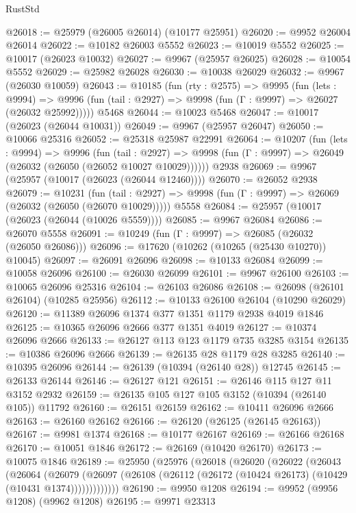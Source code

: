 \begin{lexlean}{RustStd}
\begin{coremodule}
@26018 := @25979 (@26005 @26014) (@10177 @25951)
@26020 := @9952 @26004 @26014
@26022 := @10182 @26003 @5552
@26023 := @10019 @5552
@26025 := @10017 (@26023 @10032)
@26027 := @9967 (@25957 @26025)
@26028 := @10054 @5552
@26029 := @25982 @26028
@26030 := @10038 @26029
@26032 := @9967 (@26030 @10059)
@26043 := @10185
    (fun (rty : @2575) =>
    @9995
      (fun (lets : @9994) =>
      @9996 (fun (tail : @2927) => @9998 (fun (Γ : @9997) => @26027 (@26032 @25992)))))
    @5468
@26044 := @10023 @5468
@26047 := @10017 (@26023 (@26044 @10031))
@26049 := @9967 (@25957 @26047)
@26050 := @10066 @25316
@26052 := @25318 @25987 @22991
@26064 := @10207
    (fun (lets : @9994) =>
    @9996
      (fun (tail : @2927) =>
      @9998 (fun (Γ : @9997) => @26049 (@26032 (@26050 (@26052 @10027 @10029))))))
    @2938
@26069 := @9967 (@25957 (@10017 (@26023 (@26044 @12460))))
@26070 := @26052 @2938
@26079 := @10231
    (fun (tail : @2927) => @9998 (fun (Γ : @9997) => @26069 (@26032 (@26050 (@26070 @10029)))))
    @5558
@26084 := @25957 (@10017 (@26023 (@26044 (@10026 @5559))))
@26085 := @9967 @26084
@26086 := @26070 @5558
@26091 := @10249 (fun (Γ : @9997) => @26085 (@26032 (@26050 @26086)))
@26096 := @17620 (@10262 (@10265 (@25430 @10270)) @10045)
@26097 := @26091 @26096
@26098 := @10133 @26084
@26099 := @10058 @26096
@26100 := @26030 @26099
@26101 := @9967 @26100
@26103 := @10065 @26096 @25316
@26104 := @26103 @26086
@26108 := @26098 (@26101 @26104) (@10285 @25956)
@26112 := @10133 @26100 @26104 (@10290 @26029)
@26120 := @11389 @26096 @1374 @377 @1351 @1179 @2938 @4019 @1846
@26125 := @10365 @26096 @2666 @377 @1351 @4019
@26127 := @10374 @26096 @2666
@26133 := @26127 @113 @123 @1179 @735 @3285 @3154
@26135 := @10386 @26096 @2666
@26139 := @26135 @28 @1179 @28 @3285
@26140 := @10395 @26096
@26144 := @26139 (@10394 (@26140 @28)) @12745
@26145 := @26133 @26144
@26146 := @26127 @121
@26151 := @26146 @115 @127 @11 @3152 @2932
@26159 := @26135 @105 @127 @105 @3152 (@10394 (@26140 @105)) @11792
@26160 := @26151 @26159
@26162 := @10411 @26096 @2666
@26163 := @26160 @26162
@26166 := @26120 (@26125 (@26145 @26163))
@26167 := @9981 @1374
@26168 := @10177 @26167
@26169 := @26166 @26168
@26170 := @10051 @1846
@26172 := @26169 (@10420 @26170)
@26173 := @10075 @1846
@26189 := @25950
    (@25976
      (@26018
        (@26020
          (@26022
            (@26043
              (@26064
                (@26079
                  (@26097 (@26108 (@26112 (@26172 (@10424 @26173) (@10429 (@10431 @1374)))))))))))))
@26190 := @9950 @1208
@26194 := @9952 (@9956 @1208) (@9962 @1208)
@26195 := @9971 @23313

\end{coremodule}
\end{lexlean}
